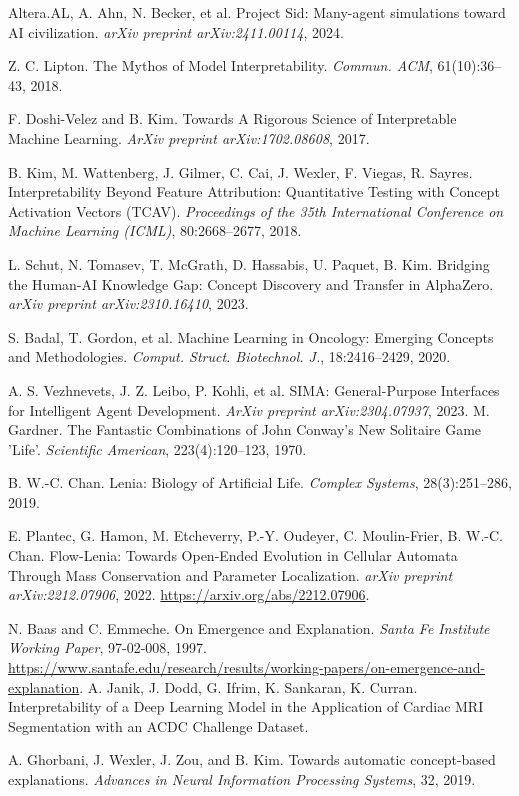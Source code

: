 \documentclass[11pt]{article}
\begin{document}
\begin{thebibliography}{9}
Altera.AL, A. Ahn, N. Becker, et al.
\newblock Project Sid: Many-agent simulations toward AI civilization.
\newblock \emph{arXiv preprint arXiv:2411.00114}, 2024.

Z. C. Lipton.
\newblock The Mythos of Model Interpretability.
\newblock \emph{Commun. ACM}, 61(10):36--43, 2018.

F. Doshi-Velez and B. Kim.
\newblock Towards A Rigorous Science of Interpretable Machine Learning.
\newblock \emph{ArXiv preprint arXiv:1702.08608}, 2017.

B. Kim, M. Wattenberg, J. Gilmer, C. Cai, J. Wexler, F. Viegas, R. Sayres.
\newblock Interpretability Beyond Feature Attribution: Quantitative Testing with Concept Activation Vectors (TCAV).
\newblock \emph{Proceedings of the 35th International Conference on Machine Learning (ICML)}, 80:2668--2677, 2018.

L. Schut, N. Tomasev, T. McGrath, D. Hassabis, U. Paquet, B. Kim.
\newblock Bridging the Human-AI Knowledge Gap: Concept Discovery and Transfer in AlphaZero.
\newblock \emph{arXiv preprint arXiv:2310.16410}, 2023.

S. Badal, T. Gordon, et al.
\newblock Machine Learning in Oncology: Emerging Concepts and Methodologies.
\newblock \emph{Comput. Struct. Biotechnol. J.}, 18:2416--2429, 2020.

A. S. Vezhnevets, J. Z. Leibo, P. Kohli, et al.
\newblock SIMA: General-Purpose Interfaces for Intelligent Agent Development.
\newblock \emph{ArXiv preprint arXiv:2304.07937}, 2023.
M. Gardner. 
\newblock The Fantastic Combinations of John Conway's New Solitaire Game 'Life'.
\newblock \emph{Scientific American}, 223(4):120--123, 1970.

B. W.-C. Chan.
\newblock Lenia: Biology of Artificial Life.
\newblock \emph{Complex Systems}, 28(3):251--286, 2019.

E. Plantec, G. Hamon, M. Etcheverry, P.-Y. Oudeyer, C. Moulin-Frier, B. W.-C. Chan.
\newblock Flow-Lenia: Towards Open-Ended Evolution in Cellular Automata Through Mass Conservation and Parameter Localization.
\newblock \emph{arXiv preprint arXiv:2212.07906}, 2022. \newblock \url{https://arxiv.org/abs/2212.07906}.

N. Baas and C. Emmeche.
\newblock On Emergence and Explanation.
\newblock \emph{Santa Fe Institute Working Paper}, 97-02-008, 1997.
\newblock \url{https://www.santafe.edu/research/results/working-papers/on-emergence-and-explanation}.
A. Janik, J. Dodd, G. Ifrim, K. Sankaran, K. Curran.
\newblock Interpretability of a Deep Learning Model in the Application of Cardiac MRI Segmentation with an ACDC Challenge Dataset.

A. Ghorbani, J. Wexler, J. Zou, and B. Kim.
\newblock Towards automatic concept-based explanations.
\newblock \emph{Advances in Neural Information Processing Systems}, 32, 2019.


\end{thebibliography}
\end{document}
